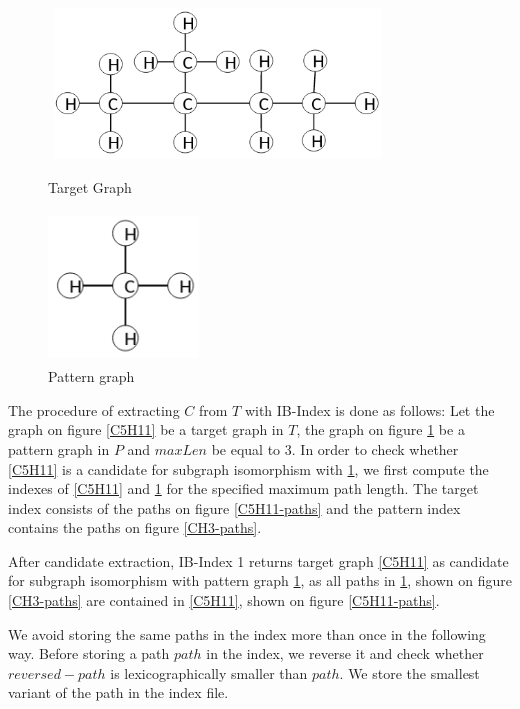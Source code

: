 \documentclass{l4proj}
\theoremstyle{definition}
\begin{document}
\begin{figure}[h]
\centering
\begin{minipage}{.5\textwidth}
  \centering
  \includegraphics[height=4cm,width=9cm]{graphs_paths/C5H11.png}
  \caption{Target Graph}
  \label{C5H11}
\end{minipage}%
\begin{minipage}{.5\textwidth}
  \centering
  \includegraphics[height=4cm,width=4cm]{graphs_paths/CH3.png}
  \caption{Pattern graph}
  \label{CH3}
\end{minipage}
\end{figure}
    
    The procedure of extracting $C$ from $T$ with IB-Index is done as follows:
    Let the graph on figure \ref{C5H11} be a target graph in $T$, the graph on figure \ref{CH3} be a pattern graph in $P$ and $maxLen$ be equal to 3. In order to check whether \ref{C5H11} is a candidate for subgraph isomorphism with \ref{CH3}, we first compute the indexes of \ref{C5H11} and \ref{CH3} for the specified maximum path length. The target index consists of the paths on figure \ref{C5H11-paths} and the pattern index contains the paths on figure \ref{CH3-paths}.
    
    After candidate extraction, IB-Index 1 returns target graph \ref{C5H11} as candidate for subgraph isomorphism with pattern graph \ref{CH3}, as all paths in \ref{CH3}, shown on figure \ref{CH3-paths} are contained in \ref{C5H11}, shown on figure \ref{C5H11-paths}. 
    
	We avoid storing the same paths in the index more than once in the following way. Before storing a path $path$ in the index, we reverse it and check whether $reversed-path$ is lexicographically smaller than $path$. We store the smallest variant of the path in the index file.
\end{document}
